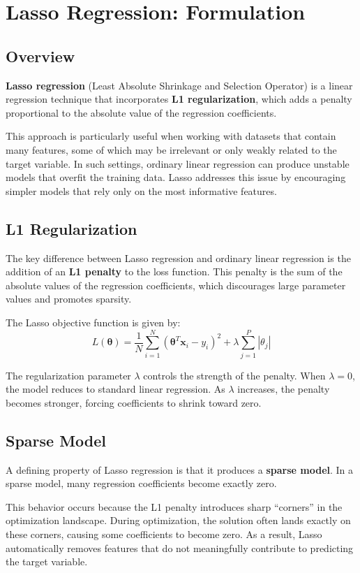 \documentclass{article}
\newcommand{\vecb}[1]{\boldsymbol{#1}} %
\newcommand{\vb}[1]{\mathbf{#1}}       %
\begin{document}
\section{Lasso Regression: Formulation}

\subsection{Overview}
\textbf{Lasso regression} (Least Absolute Shrinkage and Selection Operator) is a linear regression technique that incorporates \textbf{L1 regularization}, which adds a penalty proportional to the absolute value of the regression coefficients. 

This approach is particularly useful when working with datasets that contain many features, some of which may be irrelevant or only weakly related to the target variable. In such settings, ordinary linear regression can produce unstable models that overfit the training data. Lasso addresses this issue by encouraging simpler models that rely only on the most informative features.

\subsection{L1 Regularization}
The key difference between Lasso regression and ordinary linear regression is the addition of an \textbf{L1 penalty} to the loss function. This penalty is the sum of the absolute values of the regression coefficients, which discourages large parameter values and promotes sparsity.

The Lasso objective function is given by:
\[
L(\vecb{\theta})
=
\frac{1}{N}\sum_{i=1}^{N}
(\vecb{\theta}^T\vb{x}_i-y_i)^2
+
\lambda\sum_{j=1}^{P}|\theta_j|
\]

The regularization parameter $\lambda$ controls the strength of the penalty. When $\lambda=0$, the model reduces to standard linear regression. As $\lambda$ increases, the penalty becomes stronger, forcing coefficients to shrink toward zero.

\subsection{Sparse Model}
A defining property of Lasso regression is that it produces a \textbf{sparse model}. In a sparse model, many regression coefficients become exactly zero. 

This behavior occurs because the L1 penalty introduces sharp “corners” in the optimization landscape. During optimization, the solution often lands exactly on these corners, causing some coefficients to become zero. As a result, Lasso automatically removes features that do not meaningfully contribute to predicting the target variable.
\end{document}
